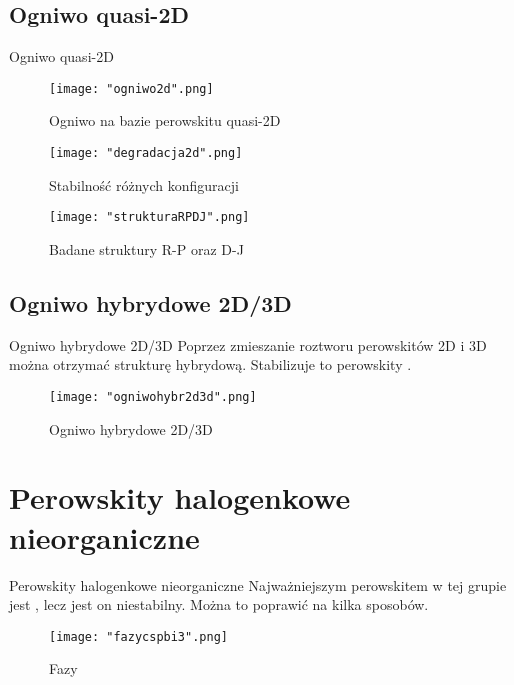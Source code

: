 \documentclass[xcolor]{beamer}
\begin{document}
\subsection{Ogniwo quasi-2D}
\begin{frame}{Ogniwo quasi-2D}
\begin{figure}[H]
\centering
\texttt{[image: "ogniwo2d".png]}
\caption{Ogniwo na bazie perowskitu quasi-2D \cite{ding}}
\end{figure}
\end{frame}

\begin{frame}
\begin{figure}[H]
\centering
\texttt{[image: "degradacja2d".png]}
\caption{Stabilność różnych konfiguracji \cite{ding}}
\end{figure}
\begin{figure}[H]
\centering
\texttt{[image: "strukturaRPDJ".png]}
\caption{Badane struktury R-P oraz D-J \cite{ding}}
\end{figure}
\end{frame}

\subsection{Ogniwo hybrydowe 2D/3D}
\begin{frame}{Ogniwo hybrydowe 2D/3D}
Poprzez zmieszanie roztworu perowskitów 2D i 3D można otrzymać strukturę hybrydową. Stabilizuje to perowskity .
\begin{figure}[H]
\centering
\texttt{[image: "ogniwohybr2d3d".png]}
\caption{Ogniwo hybrydowe 2D/3D \cite{ding}}
\end{figure}
\end{frame}

\section{Perowskity halogenkowe nieorganiczne}
\begin{frame}{Perowskity halogenkowe nieorganiczne}
Najważniejszym perowskitem w tej grupie jest , lecz jest on niestabilny. Można to poprawić na kilka sposobów.
\begin{figure}[H]
\centering
\texttt{[image: "fazycspbi3".png]}
\caption{Fazy  \cite{miyasaka}}
\end{figure}
\end{frame}
\end{document}
